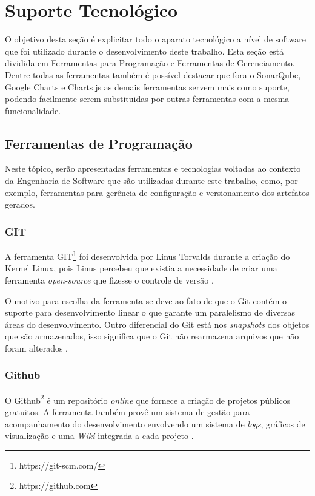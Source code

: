 
\chapter[Suporte Tecnológico]{Suporte Tecnológico}

O objetivo desta seção é explicitar todo o aparato tecnológico a nível de software que foi utilizado durante o desenvolvimento deste trabalho.  Esta seção está dividida em Ferramentas para Programação e Ferramentas de Gerenciamento. Dentre todas as ferramentas também é possível destacar que fora o SonarQube, Google Charts e Charts.js as demais ferramentas servem mais como suporte, podendo facilmente serem substituidas por outras ferramentas com a mesma funcionalidade.

\section{Ferramentas de Programação} %
\label{sec:engenharia_de_software}
	Neste tópico, serão apresentadas ferramentas e tecnologias voltadas ao contexto da Engenharia de Software que são utilizadas durante este trabalho, como, por exemplo, ferramentas para gerência de configuração e versionamento dos artefatos gerados.

	\subsection{GIT} %
	\label{sub:git}
	
		A ferramenta GIT\footnote{https://git-scm.com/} foi desenvolvida por Linus Torvalds durante a criação do Kernel Linux, pois Linus percebeu que existia a necessidade de criar uma ferramenta \textit{open-source} que fizesse o controle de versão \cite{bento_alise_2013}. 

O motivo para escolha da ferramenta se deve ao fato de que o Git contém o suporte para desenvolvimento linear o que garante um paralelismo de diversas áreas do desenvolvimento. Outro diferencial do Git está nos \textit{snapshots} dos objetos que são armazenados, isso significa que o Git não rearmazena arquivos que não foram alterados \cite{martinho_git_2013}.

	\subsection{Github} %
	\label{sub:github}
		O Github\footnote{https://github.com} é um repositório \textit{online} que fornece a criação de projetos públicos gratuitos. A ferramenta também provê um sistema de gestão para acompanhamento do desenvolvimento envolvendo um sistema de \textit{logs}, gráficos de visualização e uma \textit{Wiki} integrada a cada projeto \cite{martinho_git_2013}.
	

